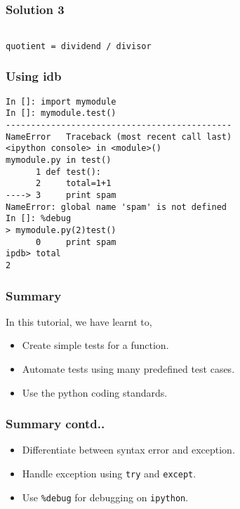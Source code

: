 \documentclass[17pt,compress]{beamer}
\begin{document}
\begin{frame}[fragile]
\frametitle{Solution 3}
\label{sec-15}

\lstset{language=Python}
\begin{lstlisting}

quotient = dividend / divisor
\end{lstlisting}
\end{frame}
\begin{frame}[fragile]
\frametitle{Using idb}
\label{sec-16}

\begin{scriptsize}
\begin{lstlisting}
In []: import mymodule
In []: mymodule.test()
---------------------------------------------
NameError   Traceback (most recent call last)
<ipython console> in <module>()
mymodule.py in test()
      1 def test():
      2     total=1+1
----> 3     print spam
NameError: global name 'spam' is not defined
In []: %debug
> mymodule.py(2)test()
      0     print spam
ipdb> total
2
\end{lstlisting}
\end{scriptsize}
\end{frame}
\begin{frame}
\frametitle{Summary}
\label{sec-17.1}

 In this tutorial, we have learnt to, 
        
\begin{itemize}
\item Create simple tests for a function.
\item Automate tests using many predefined test cases.
\item Use the python coding standards.
\end{itemize}
\end{frame}
\begin{frame}
\frametitle{Summary contd..}
\label{sec-17.2}
        
\begin{itemize}
\item Differentiate between syntax error and exception.
\item Handle exception using \texttt{try} and \texttt{except}.
\item Use \texttt{\%debug} for debugging on \texttt{ipython}.
\end{itemize}
\end{frame}
\end{document}
